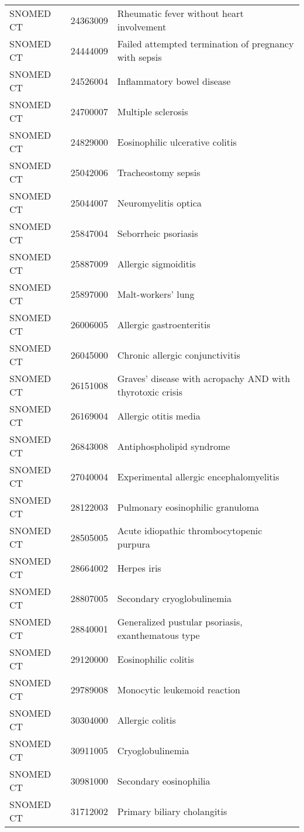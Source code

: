 \begin{longtable}{p{}p{}p{}}
  SNOMED CT & 24363009 & Rheumatic fever without heart involvement \\ 
  SNOMED CT & 24444009 & Failed attempted termination of pregnancy with sepsis \\ 
  SNOMED CT & 24526004 & Inflammatory bowel disease \\ 
  SNOMED CT & 24700007 & Multiple sclerosis \\ 
  SNOMED CT & 24829000 & Eosinophilic ulcerative colitis \\ 
  SNOMED CT & 25042006 & Tracheostomy sepsis \\ 
  SNOMED CT & 25044007 & Neuromyelitis optica \\ 
  SNOMED CT & 25847004 & Seborrheic psoriasis \\ 
  SNOMED CT & 25887009 & Allergic sigmoiditis \\ 
  SNOMED CT & 25897000 & Malt-workers' lung \\ 
  SNOMED CT & 26006005 & Allergic gastroenteritis \\ 
  SNOMED CT & 26045000 & Chronic allergic conjunctivitis \\ 
  SNOMED CT & 26151008 & Graves' disease with acropachy AND with thyrotoxic crisis \\ 
  SNOMED CT & 26169004 & Allergic otitis media \\ 
  SNOMED CT & 26843008 & Antiphospholipid syndrome \\ 
  SNOMED CT & 27040004 & Experimental allergic encephalomyelitis \\ 
  SNOMED CT & 28122003 & Pulmonary eosinophilic granuloma \\ 
  SNOMED CT & 28505005 & Acute idiopathic thrombocytopenic purpura \\ 
  SNOMED CT & 28664002 & Herpes iris \\ 
  SNOMED CT & 28807005 & Secondary cryoglobulinemia \\ 
  SNOMED CT & 28840001 & Generalized pustular psoriasis, exanthematous type \\ 
  SNOMED CT & 29120000 & Eosinophilic colitis \\ 
  SNOMED CT & 29789008 & Monocytic leukemoid reaction \\ 
  SNOMED CT & 30304000 & Allergic colitis \\ 
  SNOMED CT & 30911005 & Cryoglobulinemia \\ 
  SNOMED CT & 30981000 & Secondary eosinophilia \\ 
  SNOMED CT & 31712002 & Primary biliary cholangitis \\ 

\end{longtable}

